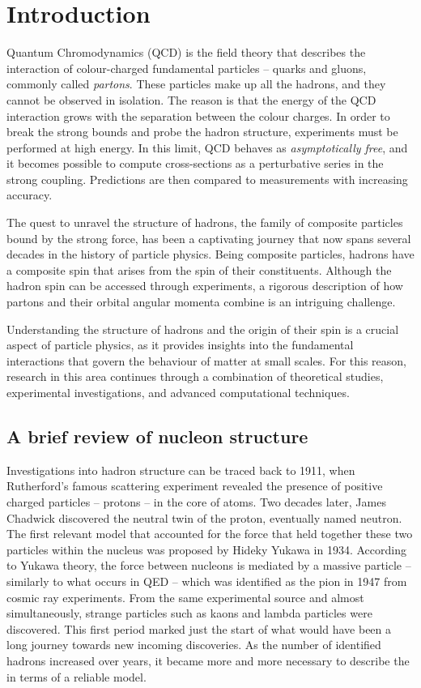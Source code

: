 \chapter{Introduction}
\label{ch:1}

Quantum Chromodynamics (QCD) is the field theory that describes the interaction of colour-charged fundamental particles -- quarks and gluons, commonly called \textit{partons}. These particles make up all the hadrons, and they cannot be observed in isolation. The reason is that the energy of the QCD interaction grows with the separation between the colour charges. In order to break the strong bounds and probe the hadron structure, experiments must be performed at high energy. In this limit, QCD  behaves as \textit{asymptotically free}, and it becomes possible to compute cross-sections as a perturbative series in the strong coupling. Predictions are then compared to measurements with increasing accuracy.%

The quest to unravel the structure of hadrons, the family of composite particles bound by the strong force, has been a captivating journey that now spans several decades in the history of particle physics. Being composite particles, hadrons have a composite spin that arises from the spin of their constituents. Although the hadron spin can be accessed through experiments, a rigorous description of how partons and their orbital angular momenta combine is an intriguing challenge.%

Understanding the structure of hadrons and the origin of their spin is a crucial aspect of particle physics, as it provides insights into the fundamental interactions that govern the behaviour of matter at small scales. For this reason, research in this area continues through a combination of theoretical studies, experimental investigations, and advanced computational techniques. 


\section{A brief review of nucleon structure}

Investigations into hadron structure can be traced back to 1911, when Rutherford's famous scattering experiment revealed the presence of positive charged particles -- protons -- in the core of atoms. Two decades later, James Chadwick discovered the neutral twin of the proton, eventually named neutron. The first relevant model that accounted for the force that held together these two particles within the nucleus was proposed by Hideky Yukawa in 1934. According to Yukawa theory, the force between nucleons is mediated by a massive particle -- similarly to what occurs in QED -- which was identified as the pion in 1947 from cosmic ray experiments. From the same experimental source and almost simultaneously, strange particles such as kaons and lambda particles were discovered. This first period marked just the start of what would have been a long journey towards new incoming discoveries. As the number of identified hadrons increased over years, it became more and more necessary to describe the  in terms of a reliable model.%

